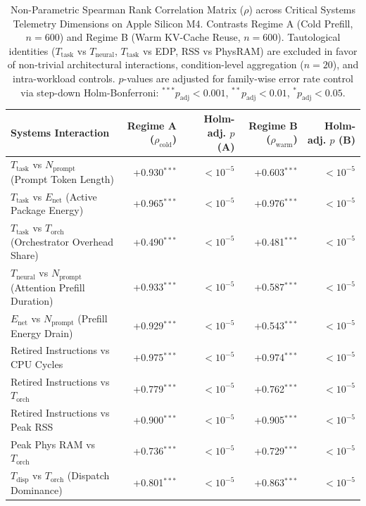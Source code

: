 \begin{table}[t]
\centering
\caption{Non-Parametric Spearman Rank Correlation Matrix ($\rho$) across Critical Systems Telemetry Dimensions on Apple Silicon M4. Contrasts Regime A (Cold Prefill, $n=600$) and Regime B (Warm KV-Cache Reuse, $n=600$). Tautological identities ($T_{\text{task}}$ vs $T_{\text{neural}}$, $T_{\text{task}}$ vs EDP, RSS vs PhysRAM) are excluded in favor of non-trivial architectural interactions, condition-level aggregation ($n=20$), and intra-workload controls. $p$-values are adjusted for family-wise error rate control via step-down Holm-Bonferroni: $^{***}p_{\text{adj}} < 0.001$, $^{**}p_{\text{adj}} < 0.01$, $^{*}p_{\text{adj}} < 0.05$.}
\label{tab:spearman_correlation}
\small
\begin{tabular}{l r r r r}
\hline
\textbf{Systems Interaction} & \textbf{Regime A ($\rho_{\text{cold}}$)} & \textbf{Holm-adj. $p$ (A)} & \textbf{Regime B ($\rho_{\text{warm}}$)} & \textbf{Holm-adj. $p$ (B)} \\
\hline
$T_{\text{task}}$ vs $N_{\text{prompt}}$ (Prompt Token Length) & +0.930$^{***}$ & $< 10^{-5}$ & +0.603$^{***}$ & $< 10^{-5}$ \\
$T_{\text{task}}$ vs $E_{\text{net}}$ (Active Package Energy) & +0.965$^{***}$ & $< 10^{-5}$ & +0.976$^{***}$ & $< 10^{-5}$ \\
$T_{\text{task}}$ vs $T_{\text{orch}}$ (Orchestrator Overhead Share) & +0.490$^{***}$ & $< 10^{-5}$ & +0.481$^{***}$ & $< 10^{-5}$ \\
$T_{\text{neural}}$ vs $N_{\text{prompt}}$ (Attention Prefill Duration) & +0.933$^{***}$ & $< 10^{-5}$ & +0.587$^{***}$ & $< 10^{-5}$ \\
$E_{\text{net}}$ vs $N_{\text{prompt}}$ (Prefill Energy Drain) & +0.929$^{***}$ & $< 10^{-5}$ & +0.543$^{***}$ & $< 10^{-5}$ \\
Retired Instructions vs CPU Cycles & +0.975$^{***}$ & $< 10^{-5}$ & +0.974$^{***}$ & $< 10^{-5}$ \\
Retired Instructions vs $T_{\text{orch}}$ & +0.779$^{***}$ & $< 10^{-5}$ & +0.762$^{***}$ & $< 10^{-5}$ \\
Retired Instructions vs Peak RSS & +0.900$^{***}$ & $< 10^{-5}$ & +0.905$^{***}$ & $< 10^{-5}$ \\
Peak Phys RAM vs $T_{\text{orch}}$ & +0.736$^{***}$ & $< 10^{-5}$ & +0.729$^{***}$ & $< 10^{-5}$ \\
$T_{\text{disp}}$ vs $T_{\text{orch}}$ (Dispatch Dominance) & +0.801$^{***}$ & $< 10^{-5}$ & +0.863$^{***}$ & $< 10^{-5}$ \\

\end{tabular}
\end{table}
